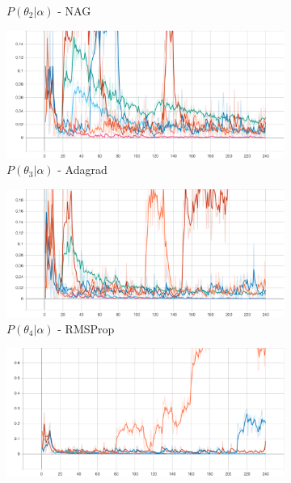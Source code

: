 \begin{figure}[htbp]
\begin{subfigure}{0.5\textwidth}
        \caption{$P(\theta_{2} | \alpha)$ - \Acs{NAG}}
        \label{fig:results:case_study:iris:p_theta:2}
    \end{subfigure}
    \begin{subfigure}{0.5\textwidth}
        \centering
        \includegraphics[width=\textwidth]{analysis/bhh_case_study/iris/theta[3].png}
        \caption{$P(\theta_{3} | \alpha)$ - \Acs{Adagrad}}
        \label{fig:results:case_study:iris:p_theta:3}
    \end{subfigure}
    \par\medskip
    \begin{subfigure}{0.5\textwidth}
        \centering
        \includegraphics[width=\textwidth]{analysis/bhh_case_study/iris/theta[4].png}
        \caption{$P(\theta_{4} | \alpha)$ - \Acs{RMSProp}}
        \label{fig:results:case_study:iris:p_theta:4}
    \end{subfigure}
    \begin{subfigure}{0.5\textwidth}
        \centering
        \includegraphics[width=\textwidth]{analysis/bhh_case_study/iris/theta[5].png}

\end{subfigure}
\end{figure}
